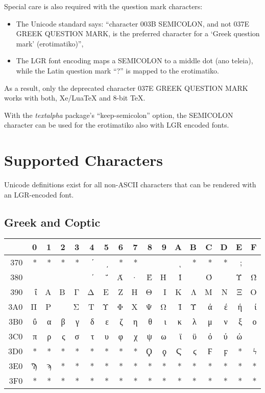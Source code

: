 \documentclass[a4paper]{article}
\begin{document}
Special care is also required with the question mark characters:
\begin{itemize}
  \item The Unicode standard says: ``character 003B SEMICOLON, and not 
  	037E GREEK QUESTION MARK, is the preferred character for a `Greek
	question mark' (erotimatiko)'',
  \item The LGR font encoding maps a SEMICOLON to a middle dot (ano teleia),
	while the Latin question mark ``?'' is mapped to the erotimatiko.
\end{itemize}
As a result, only the deprecated character 037E GREEK QUESTION MARK works
with both, Xe/LuaTeX and 8-bit TeX.

With the \emph{textalpha} package's ``keep-semicolon'' option, the 
SEMICOLON character can be used for the erotimatiko also with LGR encoded
fonts.


\section{Supported Characters}

Unicode definitions exist for all non-ASCII characters that can be rendered
with an LGR-encoded font.


\subsection{Greek and Coptic}

\greekscript
\begin{tabular}{rrrrrrrrrrrrrrrrr}
\toprule
    & 0 & 1 & 2 & 3 & 4 & 5 & 6 & 7 & 8 & 9 & A & B & \textlatin C & D & E & F\\
\midrule
\textlatin{370} & * & * & * & * & ʹ & ͵ & * & * &   &   & ͺ & * & * & * & ; &  \\
\textlatin{380} &   &   &   &   & ΄ & ΅ & Ά & · & Έ & Ή & Ί &   & Ό &   & Ύ & Ώ\\
\textlatin{390} & ΐ & Α & Β & Γ & Δ & Ε & Ζ & Η & Θ & Ι & Κ & Λ & Μ & Ν & Ξ & Ο\\
\textlatin{3A0} & Π & Ρ &   & Σ & Τ & Υ & Φ & Χ & Ψ & Ω & Ϊ & Ϋ & ά & έ & ή & ί\\
\textlatin{3B0} & ΰ & α & β & γ & δ & ε & ζ & η & θ & ι & κ & λ & μ & ν & ξ & ο\\
\textlatin{3C0} & π & ρ & ς & σ & τ & υ & φ & χ & ψ & ω & ϊ & ϋ & ό & ύ & ώ &  \\
\textlatin{3D0} & * & * & * & * & * & * & * & * & Ϙ & ϙ & Ϛ & ϛ & Ϝ & ϝ & * & ϟ\\
\textlatin{3E0} & Ϡ & ϡ & * & * & * & * & * & * & * & * & * & * & * & * & * & *\\
\textlatin{3F0} & * & * & * & * & * & * & * & * & * & * & * & * & * & * & * & *\\
\bottomrule
\end{tabular}
\latintext
\end{document}
